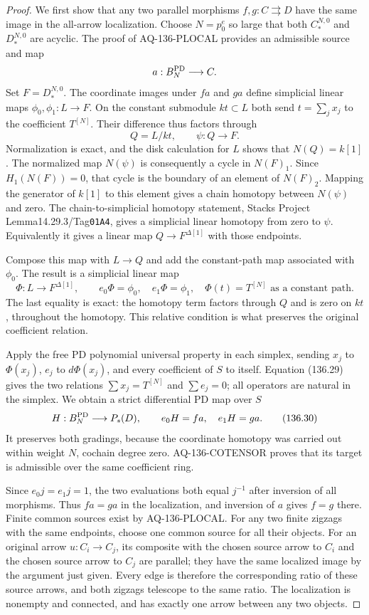 \documentclass[11pt,a4paper]{article}
\theoremstyle{definition}\newtheorem{definition}[theorem]{Definition}
\theoremstyle{remark}\newtheorem{remark}[theorem]{Remark}
\begin{document}
\begin{proof}
We first show that any two parallel morphisms
$f,g:C\rightrightarrows D$ have the same image in the
all-arrow localization.  Choose $N=p_0^e$ so large that
both $C_*^{N,0}$ and $D_*^{N,0}$ are acyclic.  The proof
of AQ-136-PLOCAL provides an admissible source and map
\[
                         a:B_N^{\rm PD}\longrightarrow C.
\]
Set $F=D_*^{N,0}$.  The coordinate images under $fa$ and
$ga$ define simplicial linear maps
$\phi_0,\phi_1:L\to F$.  On the constant submodule
$kt\subset L$ both send $t=\sum_jx_j$ to the coefficient
$T^{[N]}$.  Their difference thus factors through
\[
             Q=L/kt,\qquad \psi:Q\longrightarrow F.        \tag{136.28}
\]
Normalization is exact, and the disk calculation for $L$
shows that $N(Q)=k[1]$.
The normalized map $N(\psi)$ is consequently a cycle in
$N(F)_1$.  Since $H_1(N(F))=0$, that cycle is the boundary
of an element of $N(F)_2$.  Mapping the generator of
$k[1]$ to this element gives a chain homotopy between
$N(\psi)$ and zero.  The chain-to-simplicial homotopy
statement, Stacks Project Lemma14.29.3/Tag\nolinkurl{01A4},
gives a simplicial linear homotopy from zero to $\psi$.
Equivalently it gives a linear map
$Q\to F^{\Delta[1]}$ with those endpoints.

Compose this map with $L\to Q$ and add the constant-path
map associated with $\phi_0$.  The result is a simplicial
linear map
\[
 \Phi:L\longrightarrow F^{\Delta[1]},\qquad
 e_0\Phi=\phi_0,\quad e_1\Phi=\phi_1,\quad
 \Phi(t)=T^{[N]}\text{ as a constant path}.                 \tag{136.29}
\]
The last equality is exact: the homotopy term factors
through $Q$ and is zero on $kt$, throughout the homotopy.
This relative condition is what preserves the original
coefficient relation.

Apply the free PD polynomial universal property in each
simplex, sending $x_j$ to $\Phi(x_j)$, $e_j$ to
$d\Phi(x_j)$, and every coefficient of $S$ to itself.
Equation (136.29) gives the two relations
$\sum x_j=T^{[N]}$ and $\sum e_j=0$; all operators are
natural in the simplex.  We obtain a strict differential
PD map over $S$
\[
 H:B_N^{\rm PD}\longrightarrow P_s(D),\qquad
                         e_0H=fa,\quad e_1H=ga.            \tag{136.30}
\]
It preserves both gradings, because the coordinate
homotopy was carried out within weight $N$, cochain
degree zero.  AQ-136-COTENSOR proves that its target is
admissible over the same coefficient ring.

Since $e_0j=e_1j=1$, the two evaluations both equal
$j^{-1}$ after inversion of all morphisms.  Thus
$fa=ga$ in the localization, and inversion of $a$
gives $f=g$ there.
Finite common sources exist by AQ-136-PLOCAL.
For any two finite zigzags with the same endpoints,
choose one common source for all their objects.  For
an original arrow $u:C_i\to C_j$, its composite with
the chosen source arrow to $C_i$ and the chosen source
arrow to $C_j$ are parallel; they have the same localized
image by the argument just given.  Every edge is
therefore the corresponding ratio of these source
arrows, and both zigzags telescope to the same ratio.
The localization is nonempty and connected, and has
exactly one arrow between any two objects.


\end{proof}
\end{document}
